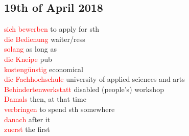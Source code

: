 \documentclass{article}
\begin{document}
\begin{multicols}{2}
	\section*{19th of April 2018}
	\textcolor{red}{sich bewerben} to apply for sth\\
	\textcolor{red}{die Bedienung} waiter/ress\\
	\textcolor{red}{solang} as long as \\ 
	\textcolor{red}{die Kneipe} pub\\
	\textcolor{red}{kostengünstig} economical\\ 
	\textcolor{red}{die Fachhochschule} university of applied sciences and arts\\ 
	\textcolor{red}{Behindertenwerkstatt} disabled (people's) workshop \\
	\textcolor{red}{Damals} then, at that time\\ 
	\textcolor{red}{verbringen} to spend sth somewhere\\ 
	\textcolor{red}{danach} after it\\
	\textcolor{red}{zuerst} the first \\ 
	
	

	
	
	
	
	
	\end{multicols}

	\printglossaries
	
\end{document}
